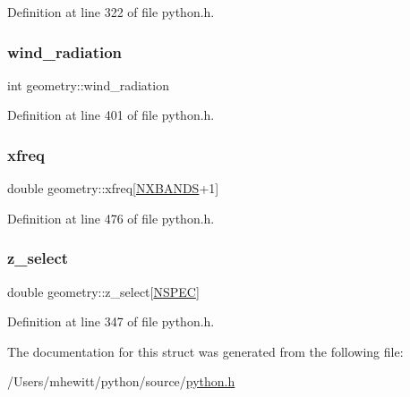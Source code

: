 Definition at line 322 of file python.\+h.

\mbox{\label{structgeometry_aff6d34b209264b154fa7bd36266f70de}} 
\subsubsection{\texorpdfstring{wind\+\_\+radiation}{wind\_radiation}}
{\footnotesize\ttfamily int geometry\+::wind\+\_\+radiation}



Definition at line 401 of file python.\+h.

\mbox{\label{structgeometry_aaf647ea9c7e3521a4063a0966cbe35e7}} 
\subsubsection{\texorpdfstring{xfreq}{xfreq}}
{\footnotesize\ttfamily double geometry\+::xfreq\mbox{[}\hyperlink{python_8h_ac640b7fc429348ef2f6781704d3c5163}{N\+X\+B\+A\+N\+DS}+1\mbox{]}}



Definition at line 476 of file python.\+h.

\mbox{\label{structgeometry_aea2042fe2011ace4827d2b0e0792168d}} 
\subsubsection{\texorpdfstring{z\+\_\+select}{z\_select}}
{\footnotesize\ttfamily double geometry\+::z\+\_\+select\mbox{[}\hyperlink{python_8h_ade1df1cb82ae4ef9a5c0cddb37d9a73b}{N\+S\+P\+EC}\mbox{]}}



Definition at line 347 of file python.\+h.



The documentation for this struct was generated from the following file\+:\begin{DoxyCompactItemize}
\item 
/\+Users/mhewitt/python/source/\hyperlink{python_8h}{python.\+h}\end{DoxyCompactItemize}
